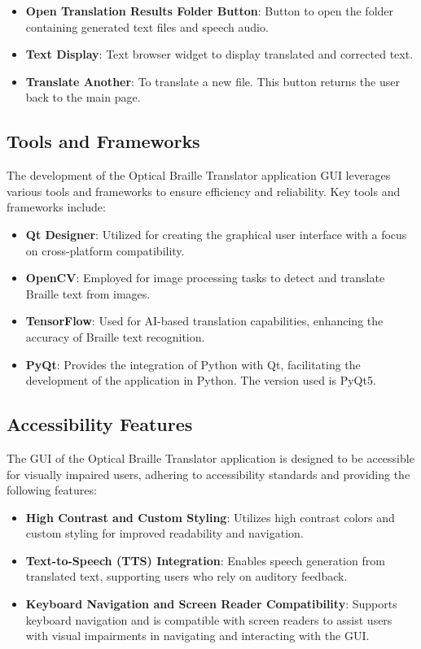 \begin{itemize}
\begin{itemize}
        \begin{itemize}
            \item \textbf{Open Translation Results Folder Button}: Button to open the folder containing generated text files and speech audio.
            \item \textbf{Text Display}: Text browser widget to display translated and corrected text.
            \item \textbf{Translate Another}: To translate a new file. This button returns the user back to the main page.
        \end{itemize}
    \end{itemize}
\end{itemize}

\subsection{Tools and Frameworks}
The development of the Optical Braille Translator application GUI leverages various tools and frameworks to ensure efficiency and reliability. Key tools and frameworks include:

\begin{itemize}
    \item \textbf{Qt Designer}: Utilized for creating the graphical user interface with a focus on cross-platform compatibility.
    \item \textbf{OpenCV}: Employed for image processing tasks to detect and translate Braille text from images.
    \item \textbf{TensorFlow}: Used for AI-based translation capabilities, enhancing the accuracy of Braille text recognition.
    \item \textbf{PyQt}: Provides the integration of Python with Qt, facilitating the development of the application in Python. The version used is PyQt5.
\end{itemize}


\subsection{Accessibility Features}

The GUI of the Optical Braille Translator application is designed to be accessible for visually impaired users, adhering to accessibility standards and providing the following features:

\begin{itemize}
    \item \textbf{High Contrast and Custom Styling}: Utilizes high contrast colors and custom styling for improved readability and navigation.
    
    \item \textbf{Text-to-Speech (TTS) Integration}: Enables speech generation from translated text, supporting users who rely on auditory feedback.
    
    \item \textbf{Keyboard Navigation and Screen Reader Compatibility}: Supports keyboard navigation and is compatible with screen readers to assist users with visual impairments in navigating and interacting with the GUI.
\end{itemize}

